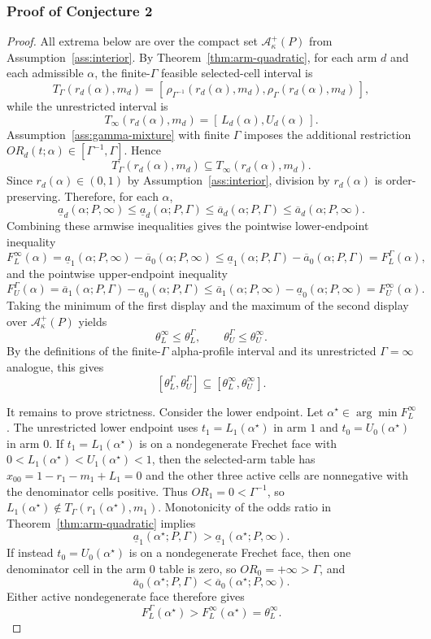 \documentclass[11pt]{article}
\theoremstyle{definition}
\theoremstyle{plain}
\theoremstyle{remark}
\begin{document}
\subsubsection*{Proof of Conjecture 2}
\begin{proof}
All extrema below are over the compact set \(\mathcal A_\kappa^+(P)\) from
Assumption~\ref{ass:interior}.  By Theorem~\ref{thm:arm-quadratic}, for each
arm \(d\) and each admissible \(\alpha\), the finite-\(\Gamma\) feasible
selected-cell interval is
\[
  T_\Gamma(r_d(\alpha),m_d)
  =
  [\,\rho_{\Gamma^{-1}}(r_d(\alpha),m_d),\rho_\Gamma(r_d(\alpha),m_d)\,],
\]
while the unrestricted interval is
\[
  T_\infty(r_d(\alpha),m_d)
  =
  [\,L_d(\alpha),U_d(\alpha)\,].
\]
Assumption~\ref{ass:gamma-mixture} with finite \(\Gamma\) imposes the
additional restriction \(OR_d(t;\alpha)\in[\Gamma^{-1},\Gamma]\).  Hence
\[
  T_\Gamma(r_d(\alpha),m_d)\subseteq T_\infty(r_d(\alpha),m_d).
\]
Since \(r_d(\alpha)\in(0,1)\) by Assumption~\ref{ass:interior}, division by
\(r_d(\alpha)\) is order-preserving.  Therefore, for each \(\alpha\),
\[
  \underline a_d(\alpha;P,\infty)
  \le
  \underline a_d(\alpha;P,\Gamma)
  \le
  \overline a_d(\alpha;P,\Gamma)
  \le
  \overline a_d(\alpha;P,\infty).
\]
Combining these armwise inequalities gives the pointwise lower-endpoint
inequality
\[
  F_L^\infty(\alpha)
  =
  \underline a_1(\alpha;P,\infty)-\overline a_0(\alpha;P,\infty)
  \le
  \underline a_1(\alpha;P,\Gamma)-\overline a_0(\alpha;P,\Gamma)
  =
  F_L^\Gamma(\alpha),
\]
and the pointwise upper-endpoint inequality
\[
  F_U^\Gamma(\alpha)
  =
  \overline a_1(\alpha;P,\Gamma)-\underline a_0(\alpha;P,\Gamma)
  \le
  \overline a_1(\alpha;P,\infty)-\underline a_0(\alpha;P,\infty)
  =
  F_U^\infty(\alpha).
\]
Taking the minimum of the first display and the maximum of the second display
over \(\mathcal A_\kappa^+(P)\) yields
\[
  \theta_L^\infty\le \theta_L^\Gamma,
  \qquad
  \theta_U^\Gamma\le \theta_U^\infty.
\]
By the definitions of the finite-\(\Gamma\) alpha-profile interval and its
unrestricted \(\Gamma=\infty\) analogue, this gives
\[
  [\theta_L^\Gamma,\theta_U^\Gamma]\subseteq[\theta_L^\infty,\theta_U^\infty].
\]

It remains to prove strictness.  Consider the lower endpoint.  Let
\(\alpha^\star\in\arg\min F_L^\infty\).  The unrestricted lower endpoint uses
\(t_1=L_1(\alpha^\star)\) in arm \(1\) and \(t_0=U_0(\alpha^\star)\) in arm
\(0\).  If \(t_1=L_1(\alpha^\star)\) is on a nondegenerate Frechet face with
\(0<L_1(\alpha^\star)<U_1(\alpha^\star)<1\), then the selected-arm table has
\(x_{00}=1-r_1-m_1+L_1=0\) and the other three active cells are nonnegative
with the denominator cells positive.  Thus \(OR_1=0<\Gamma^{-1}\), so
\(L_1(\alpha^\star)\notin T_\Gamma(r_1(\alpha^\star),m_1)\).  Monotonicity of
the odds ratio in Theorem~\ref{thm:arm-quadratic} implies
\[
  \underline a_1(\alpha^\star;P,\Gamma)
  >
  \underline a_1(\alpha^\star;P,\infty).
\]
If instead \(t_0=U_0(\alpha^\star)\) is on a nondegenerate Frechet face, then
one denominator cell in the arm \(0\) table is zero, so
\(OR_0=+\infty>\Gamma\), and
\[
  \overline a_0(\alpha^\star;P,\Gamma)
  <
  \overline a_0(\alpha^\star;P,\infty).
\]
Either active nondegenerate face therefore gives
\[
  F_L^\Gamma(\alpha^\star)>F_L^\infty(\alpha^\star)=\theta_L^\infty.
\]


\end{proof}
\end{document}
